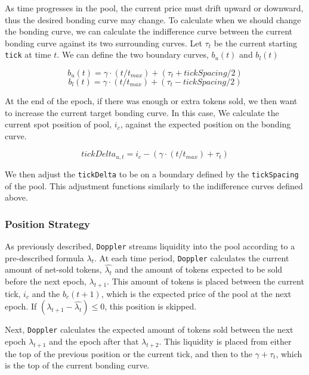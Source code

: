 \documentclass[sigconf,nonacm,prologue,table]{acmart}
\numberwithin{equation}{section}
\theoremstyle{definition}
\theoremstyle{remark}
\begin{document}
As time progresses in the pool, the current price must drift upward or downward, thus the desired bonding curve may change. To calculate when we should change the bonding curve, we can calculate the indifference curve between the current bonding curve against its two surrounding curves. Let $\tau_{t}$ be the current starting \verb|tick| at time $t$. We can define the two boundary curves, $b_u(t)$ and $b_l(t)$

\begin{equation} \label{eq:upperboundry}
    b_u(t) = \gamma \cdot (t / t_{max}) + (\tau_{t} + tickSpacing / 2)
\end{equation}
\begin{equation} \label{eq:lowerboundry}
    b_l(t) = \gamma \cdot (t / t_{max}) + (\tau_{t} - tickSpacing / 2)
\end{equation}

At the end of the epoch, if there was enough or extra tokens sold, we then want to increase the current target bonding curve. In this case, We calculate the current spot position of pool, $i_c$, against the expected position on the bonding curve.

\begin{equation} 
   tickDelta_{u,t} = i_c - (\gamma \cdot (t / t_{max}) + \tau_t)
\end{equation} 

We then adjust the \verb|tickDelta| to be on a boundary defined by the \verb|tickSpacing| of the pool. This adjustment functions similarly to the indifference curves defined above.

\subsubsection{Position Strategy}

As previously described, \verb|Doppler| streams liquidity into the pool according to a pre-described formula $\lambda_t$. At each time period, \verb|Doppler| calculates the current amount of net-sold tokens, $\hat{\lambda_t}$ and the amount of tokens expected to be sold before the next epoch, $\lambda_{t+1}$. This amount of tokens is placed between the current tick, $i_c$ and the $b_c(t+1)$, which is the expected price of the pool at the next epoch. If $(\lambda_{t+1} - \hat{\lambda_t}) \leq 0$, this position is skipped.

Next, \verb|Doppler| calculates the expected amount of tokens sold between the next epoch $\lambda_{t+1}$ and the epoch after that $\lambda_{t+2}$. This liquidity is placed from either the top of the previous position or the current tick, and then to the $\gamma + \tau_t$, which is the top of the current bonding curve.
\end{document}
